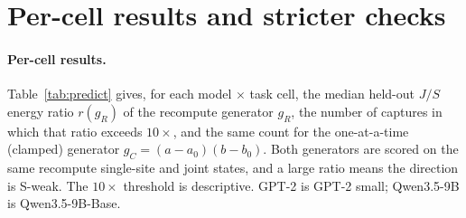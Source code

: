\section{Per-cell results and stricter checks}
\label{app:units}

\paragraph{Per-cell results.} Table~\ref{tab:predict} gives, for each model $\times$ task cell, the median held-out $J/S$
energy ratio $r(g_R)$ of the recompute generator $g_R$, the number of captures in which that ratio exceeds $10\times$,
and the same count for the one-at-a-time (clamped) generator $g_C=(a-a_0)(b-b_0)$. Both generators are scored on the same
recompute single-site and joint states, and a large ratio means the direction is S-weak. The $10\times$ threshold is
descriptive. GPT-2 is GPT-2 small; Qwen3.5-9B is Qwen3.5-9B-Base.

